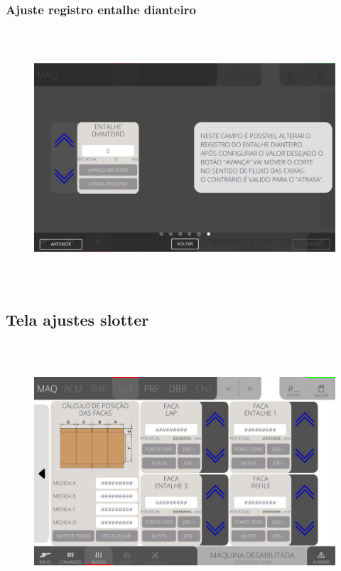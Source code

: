 \newpage
\thispagestyle{fancy}
\vspace*{\fill}
\subsubsection{\small{Ajuste registro entalhe dianteiro}}
\begin{figure}[h]
  \centering
  \includegraphics[width=576px,height=360px]{src/imagesFlexo/05-slotter/settings/e-6.png}
\end{figure}
\vspace*{\fill}

\newpage
\thispagestyle{fancy}
\vspace*{\fill}
\subsection{Tela ajustes slotter}
\begin{figure}[h]
  \centering
  \includegraphics[width=576px,height=360px]{src/imagesFlexo/05-slotter/settings/e-Tela-Principal-2.png}
\end{figure}

